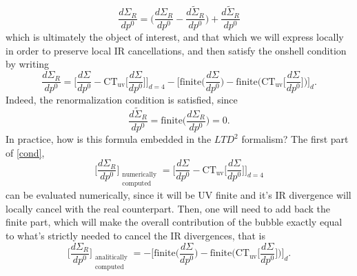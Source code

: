 \documentclass[11pt]{article}
\begin{document}
\begin{equation}
\frac{d\Sigma_R}{dp^0}=\Bigg(\frac{d\Sigma_R}{dp^0}-\frac{d\tilde\Sigma_R}{dp^0}\Bigg)+\frac{d\tilde\Sigma_R}{dp^0}
\end{equation}
which is ultimately the object of interest, and that which we will express locally in order to preserve local IR cancellations, and then satisfy the onshell condition by writing
\begin{equation}\label{cond}
\frac{d\Sigma_R}{dp^0}=\Bigg[\frac{d\Sigma}{dp^0}-\text{CT}_\text{uv}\Bigg[\frac{d\Sigma}{dp^0}\Bigg]\Bigg]_{d=4}-\Bigg[\text{finite}\Bigg(\frac{d\Sigma}{dp^0}\Bigg)-\text{finite}\Bigg(\text{CT}_\text{uv}\Bigg[\frac{d\Sigma}{dp^0}\Bigg]\Bigg)\Bigg]_d.
\end{equation}
Indeed, the renormalization condition is satisfied, since
\begin{equation}
\frac{d\tilde\Sigma_R}{dp^0}=\text{finite}\Bigg(\frac{d\Sigma_R}{dp^0}\Bigg)=0.\end{equation}
In practice, how is this formula embedded in the $LTD^2$ formalism? The first part of \eqref{cond},
\begin{equation}
\Bigg[\frac{d\Sigma_R}{dp^0}\Bigg]_{\substack{\text{numerically}\\ \text{computed}}}=\Bigg[\frac{d\Sigma}{dp^0}-\text{CT}_\text{uv}\Bigg[\frac{d\Sigma}{dp^0}\Bigg]\Bigg]_{d=4}
\end{equation}
 can be evaluated numerically, since it will be UV finite and it's IR divergence will locally cancel with the real counterpart. Then, one will need to add back the finite part, which will make the overall contribution of the bubble exactly equal to what's strictly needed to cancel the IR divergences, that is
  \begin{equation}
\Bigg[\frac{d\Sigma_R}{dp^0}\Bigg]_{\substack{\text{analitically}\\ \text{computed}}}=-\Bigg[\text{finite}\Bigg(\frac{d\Sigma}{dp^0}\Bigg)-\text{finite}\Bigg(\text{CT}_\text{uv}\Bigg[\frac{d\Sigma}{dp^0}\Bigg]\Bigg)\Bigg]_d.
\end{equation}





\end{document}
